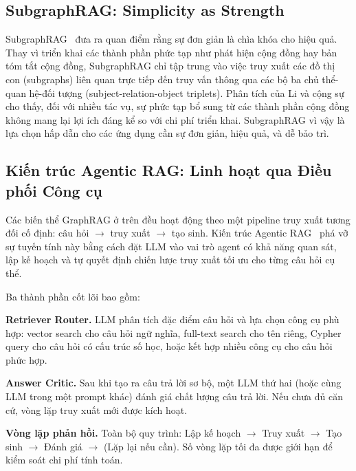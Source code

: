 \documentclass[12pt,a4paper]{report}
\theoremstyle{plain}
\theoremstyle{definition}
\begin{document}
	\subsection{SubgraphRAG: Simplicity as Strength}
	\label{subsec:subgraphrag}
	
	SubgraphRAG~\cite{subgraphrag2025} đưa ra quan điểm rằng sự đơn giản là chìa
	khóa cho hiệu quả. Thay vì triển khai các thành phần phức tạp như phát hiện
	cộng đồng hay bản tóm tắt cộng đồng, SubgraphRAG chỉ tập trung vào việc truy
	xuất các đồ thị con (subgraphs) liên quan trực tiếp đến truy vấn thông qua các
	bộ ba chủ thể-quan hệ-đối tượng (subject-relation-object triplets). Phân tích
	của Li và cộng sự cho thấy, đối với nhiều tác vụ, sự phức tạp bổ sung từ các
	thành phần cộng đồng không mang lại lợi ích đáng kể so với chi phí triển khai.
	SubgraphRAG vì vậy là lựa chọn hấp dẫn cho các ứng dụng cần sự đơn giản, hiệu
	quả, và dễ bảo trì.
	
	\subsection{Kiến trúc Agentic RAG: Linh hoạt qua Điều phối Công cụ}
	\label{subsec:agentic_rag}
	
	Các biến thể GraphRAG ở trên đều hoạt động theo một pipeline truy xuất tương
	đối cố định: câu hỏi $\to$ truy xuất $\to$ tạo sinh. Kiến trúc Agentic
	RAG~\cite{neo4j2024essential} phá vỡ sự tuyến tính này bằng cách đặt LLM vào
	vai trò agent có khả năng quan sát, lập kế hoạch và tự quyết định chiến lược
	truy xuất tối ưu cho từng câu hỏi cụ thể.
	
	Ba thành phần cốt lõi bao gồm:
	
	\textbf{Retriever Router.} LLM phân tích đặc điểm câu hỏi và lựa chọn công
	cụ phù hợp: vector search cho câu hỏi ngữ nghĩa, full-text search cho tên
	riêng, Cypher query cho câu hỏi có cấu trúc số học, hoặc kết hợp nhiều công
	cụ cho câu hỏi phức hợp.
	
	\textbf{Answer Critic.} Sau khi tạo ra câu trả lời sơ bộ, một LLM thứ hai
	(hoặc cùng LLM trong một prompt khác) đánh giá chất lượng câu trả lời. Nếu
	chưa đủ căn cứ, vòng lặp truy xuất mới được kích hoạt.
	
	\textbf{Vòng lặp phản hồi.} Toàn bộ quy trình: Lập kế hoạch $\to$ Truy xuất
	$\to$ Tạo sinh $\to$ Đánh giá $\to$ (Lặp lại nếu cần). Số vòng lặp tối đa
	được giới hạn để kiểm soát chi phí tính toán.
	
\end{document}
